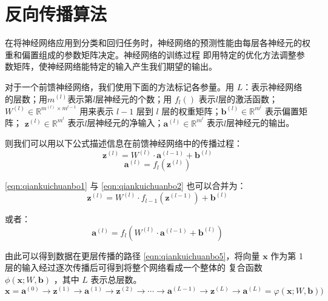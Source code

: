 \section{反向传播算法}
在将神经网络应用到分类和回归任务时，神经网络的预测性能由每层各神经元的权重和偏置组成的参数矩阵决定。神经网络的训练过程
即用特定的优化方法调整参数矩阵，使神经网络能特定的输入产生我们期望的输出。

对于一个前馈神经网络，我们使用下面的方法标记各参量。用 $L$：表示神经网络的层数；用$m^{(l)}$表示第$l$层神经元的个数；用
$f_l ()$ 表示$l$层的激活函数；$W ^ { ( l ) } \in \mathbb { R } ^ { m ^ { ( l ) } \times m ^ { l - 1 } }$ 用来表示
$l-1$ 层到 $l$ 层的权重矩阵；$\mathbf { b } ^ { ( l ) } \in \mathbb { R } ^ { m ^ { l } }$ 表示偏置矩阵；
$\mathbf { z } ^ { ( l ) } \in \mathbb { R } ^ { m ^ { l } }$ 表示$l$层神经元的净输入；$\mathbf { a } ^ { ( l ) } \in \mathbb { R } ^ { m ^ { l } }$
表示$l$层神经元的输出。

则我们可以用以下公式描述信息在前馈神经网络中的传播过程：
\begin{equation}
	\label{eqn:qiankuichuanbo1}
	\mathbf { z } ^ { ( l ) } = W ^ { ( l ) } \cdot \mathbf { a } ^ { ( l - 1 ) } + \mathbf { b } ^ { ( l ) }
\end{equation}
\begin{equation}
	\label{eqn:qiankuichuanbo2}
	\mathbf { a } ^ { ( l ) } = f _ { l } \left( \mathbf { z } ^ { ( l ) } \right)
\end{equation}

\ref{eqn:qiankuichuanbo1} 与 \ref{eqn:qiankuichuanbo2} 也可以合并为：
\begin{equation}
	\label{eqn:qiankuichuanbo3}
	\mathbf { z } ^ { ( l ) } = W ^ { ( l ) } \cdot f _ { l - 1 } \left( \mathbf { z } ^ { ( l - 1 ) } \right) + \mathbf { b } ^ { ( l ) }
\end{equation}

或者：
\begin{equation}
	\label{eqn:qiankuichuanbo4}
	\mathbf { a } ^ { ( l ) } = f _ { l } \left( W ^ { ( l ) } \cdot \mathbf { a } ^ { ( l - 1 ) } + \mathbf { b } ^ { ( l ) } \right)
\end{equation}

由此可以得到数据在更层传播的路径 \ref{eqn:qiankuichuanbo5}，将向量 $\mathbf{x}$ 作为第 1 层的输入经过逐次传播后可得到将整个网络看成一个整体的
复合函数 $\phi(\mathbf{x} ; W, \mathbf{b})$
，其中 $L$ 表示总层数。
\begin{equation}
	\label{eqn:qiankuichuanbo5}
	\mathbf{x}=\mathbf{a}^{(0)} \rightarrow \mathbf{z}^{(1)} \rightarrow \mathbf{a}^{(1)} \rightarrow \mathbf{z}^{(2)} \rightarrow \cdots \rightarrow \mathbf{a}^{(L-1)} \rightarrow \mathbf{z}^{(L)} \rightarrow \mathbf{a}^{(L)}=\varphi(\mathbf{x} ; W, \mathbf{b}) )
\end{equation}

